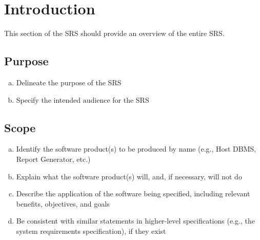 \documentclass[english]{article}
\begin{document}
\vspace*{\fill} 
\vspace*{\fill} 

\newpage

\tableofcontents

\newpage

\setcounter{page}{1}
\raggedright

\section{Introduction}
\label{sec:introduction}

This section of the SRS should provide an overview of the entire SRS.

\subsection{Purpose}
\label{sub:purpose}
\begin{enumerate}[a)]
	\item Delineate the purpose of the SRS
	\item Specify the intended audience for the SRS
\end{enumerate}

\subsection{Scope}
\label{sub:scope}
\begin{enumerate}[a)]
	\item Identify the software product(s) to be produced by name (e.g., Host DBMS, Report Generator, etc.)
	\item Explain what the software product(s) will, and, if necessary, will not do
	\item Describe the application of the software being specified, including relevant benefits, objectives, and goals
	\item Be consistent with similar statements in higher-level specifications (e.g., the system requirements specification), if they exist
\end{enumerate}
\end{document}
